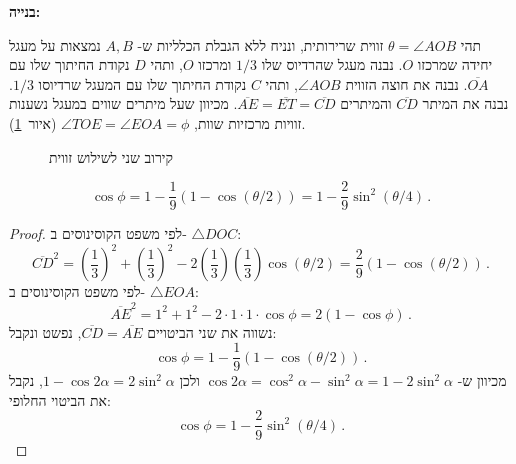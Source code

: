 \noindent\textbf{בנייה:}

תהי
$\theta=\angle AOB$
זווית שרירותית, ונניח ללא הגבלת הכלליות ש-%
$A,B$
נמצאות על מעגל יחידה שמרכזו
$O$.
נבנה מעגל שהרדיוס שלו
$1/3$
ומרכזו
$O$,
ותהי
$D$
נקודת החיתוך שלו עם
$\overline{OA}$.
נבנה את חוצה הזווית
$\angle AOB$,
ותהי
$C$
נקודת החיתוך שלו עם המעגל שרדיוסו
$1/3$.
נבנה את המיתר
$\overline{CD}$
והמיתרים
$\overline{AE}=\overline{ET}=\overline{CD}$.
מכיוון שעל מיתרים שווים במעגל נשענות זוויות מרכזיות שוות,
$\angle TOE=\angle EOA=\phi$
(איור~\ref{f.trisect-second-approx}).

\begin{figure}[tb]
\begin{center}
\end{center}
\caption{קירוב שני לשילוש זווית}
\label{f.trisect-second-approx}
\end{figure}

\begin{theorem}
\[
\cos\phi=1 - \frac{1}{9}(1-\cos(\theta/2))=1 - \frac{2}{9}\sin^2(\theta/4)\,.
\]
\end{theorem}

\begin{proof}
לפי משפט הקוסינוסים ב-%
$\triangle DOC$:
\[
\overline{CD}^2= \left(\frac{1}{3}\right)^2+\left(\frac{1}{3}\right)^2-2\left(\frac{1}{3}\right)\left(\frac{1}{3}\right)\cos (\theta/2)=\frac{2}{9}(1-\cos(\theta/2))\,.
\]
לפי משפט הקוסינוסים ב-%
$\triangle EOA$:
\[
\overline{AE}^2 = 1^2+1^2-2\cdot 1\cdot 1\cdot \cos \phi=2(1-\cos \phi)\,.
\]
נשווה את שני הביטויים 
$\overline{CD}=\overline{AE}$,
נפשט ונקבל:
\[
\cos \phi = 1 - \frac{1}{9}(1-\cos(\theta/2))\,.
\]
מכיוון ש-%
$\cos 2\alpha= \cos^2 \alpha-\sin^2\alpha=1-2\sin^2\alpha$
ולכן
$1-\cos 2\alpha=2\sin^2\alpha$,
נקבל את הביטוי החלופי:
\[
\cos \phi = 1 - \frac{2}{9}\sin^2(\theta/4)\,.
\]
\end{proof}

